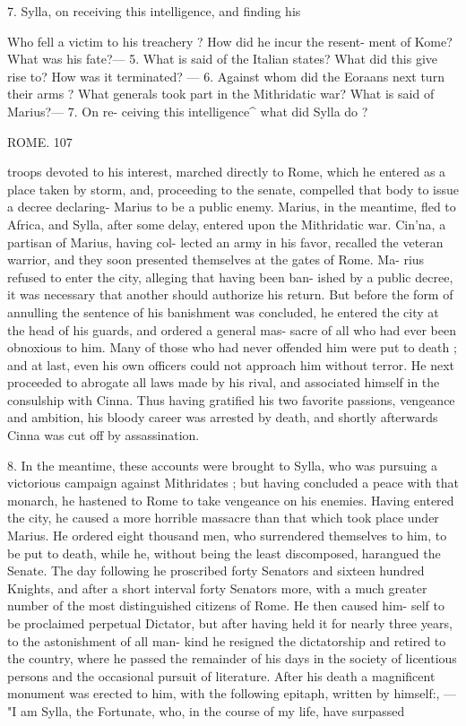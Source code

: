 \documentclass[openany,a4paper]{memoir}
\begin{document}
7. Sylla, on receiving this intelligence, and finding his 

Who fell a victim to his treachery ? How did he incur the resent- 
ment of Kome? What was his fate?— 5. What is said of the Italian 
states? What did this give rise to? How was it terminated? — 6. 
Against whom did the Eoraans next turn their arms ? What generals 
took part in the Mithridatic war? What is said of Marius?— 7. On re- 
ceiving this intelligence^ what did Sylla do ? 



ROME. 107 

troops devoted to his interest, marched directly to Rome, 
which he entered as a place taken by storm, and, proceeding 
to the senate, compelled that body to issue a decree declaring- 
Marius to be a public enemy. Marius, in the meantime, 
fled to Africa, and Sylla, after some delay, entered upon the 
Mithridatic war. Cin'na, a partisan of Marius, having col- 
lected an army in his favor, recalled the veteran warrior, and 
they soon presented themselves at the gates of Rome. Ma- 
rius refused to enter the city, alleging that having been ban- 
ished by a public decree, it was necessary that another should 
authorize his return. But before the form of annulling the 
sentence of his banishment was concluded, he entered the 
city at the head of his guards, and ordered a general mas- 
sacre of all who had ever been obnoxious to him. Many of 
those who had never offended him were put to death ; and 
at last, even his own officers could not approach him without 
terror. He next proceeded to abrogate all laws made by his 
rival, and associated himself in the consulship with Cinna. 
Thus having gratified his two favorite passions, vengeance 
and ambition, his bloody career was arrested by death, and 
shortly afterwards Cinna was cut off by assassination. 

8. In the meantime, these accounts were brought to Sylla, 
who was pursuing a victorious campaign against Mithridates ; 
but having concluded a peace with that monarch, he hastened 
to Rome to take vengeance on his enemies. Having entered 
the city, he caused a more horrible massacre than that which 
took place under Marius. He ordered eight thousand men, 
who surrendered themselves to him, to be put to death, while 
he, without being the least discomposed, harangued the 
Senate. The day following he proscribed forty Senators 
and sixteen hundred Knights, and after a short interval 
forty Senators more, with a much greater number of the 
most distinguished citizens of Rome. He then caused him- 
self to be proclaimed perpetual Dictator, but after having 
held it for nearly three years, to the astonishment of all man- 
kind he resigned the dictatorship and retired to the country, 
where he passed the remainder of his days in the society of 
licentious persons and the occasional pursuit of literature. 
After his death a magnificent monument was erected to him, 
with the following epitaph, written by himself:, — "I am Sylla, 
the Fortunate, who, in the course of my life, have surpassed 
\end{document}
